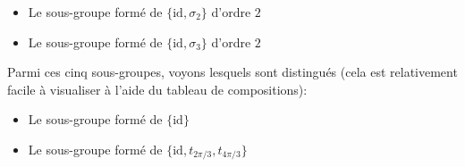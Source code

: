 \begin{tcolorbox}[colframe=black,colback=white,sharp corners]
\begin{itemize}
		\item Le sous-groupe formé de $\{\text{id},\sigma_2\}$ d'ordre $2$

		\item Le sous-groupe formé de $\{\text{id},\sigma_3\}$ d'ordre $2$
	\end{itemize}
	Parmi ces cinq sous-groupes, voyons lesquels sont distingués (cela est relativement facile à visualiser à l'aide du tableau de compositions):
	\begin{itemize}
		\item Le sous-groupe formé de $\{\text{id}\}$
	
		\item Le sous-groupe formé de $\{\text{id},t_{2\pi/3},t_{4\pi/3}\}$ 
	\end{itemize}
	\end{tcolorbox}
	
